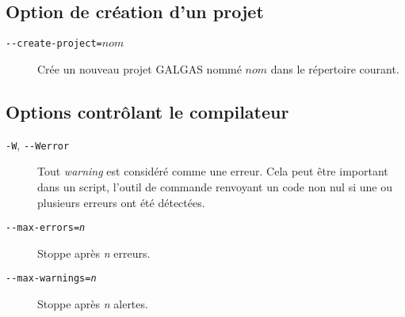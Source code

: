 \subsection{Option de création d'un projet}

\begin{description}

  \item[\texttt{-{-}create-project=$nom$}] Crée un nouveau projet GALGAS nommé $nom$ dans le répertoire courant.

\end{description}



\subsection{Options contrôlant le compilateur}




\begin{description}

  \item[\texttt{-W}, \texttt{-{-}Werror}] Tout \emph{warning} est considéré comme une erreur. Cela peut être important dans un script, l’outil de commande renvoyant un code non nul si une ou plusieurs erreurs ont été détectées.

  \item[\texttt{-{-}max-errors=\emph{n}}] Stoppe après \emph{n} erreurs.

  \item[\texttt{-{-}max-warnings=\emph{n}}] Stoppe après \emph{n} alertes.

\end{description}





